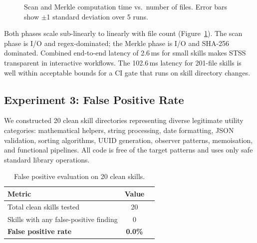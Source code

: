 \documentclass[11pt,twocolumn]{article}
\begin{document}
\begin{figure}[t]
\centering
{}
\caption{Scan and Merkle computation time vs.\ number of files.
Error bars show $\pm$1 standard deviation over 5 runs.}
\label{fig:perf}
\end{figure}

Both phases scale sub-linearly to linearly with file count
(Figure~\ref{fig:perf}). The scan phase is I/O and regex-dominated;
the Merkle phase is I/O and SHA-256 dominated. Combined end-to-end
latency of 2.6\,ms for small skills makes STSS transparent in interactive
workflows. The 102.6\,ms latency for 201-file skills is well within
acceptable bounds for a CI gate that runs on skill directory changes.

\subsection{Experiment 3: False Positive Rate}

We constructed 20 clean skill directories representing diverse legitimate
utility categories: mathematical helpers, string processing, date formatting,
JSON validation, sorting algorithms, UUID generation, observer patterns,
memoisation, and functional pipelines. All code is free of the target patterns
and uses only safe standard library operations.

\begin{table}[h]
\centering
\caption{False positive evaluation on 20 clean skills.}
\label{tab:fp}
\renewcommand{\arraystretch}{1.1}
\scriptsize
\begin{tabular}{lcc}
\toprule
\textbf{Metric} & \textbf{Value} \\
\midrule
Total clean skills tested & 20 \\
Skills with any false-positive finding & 0 \\
\textbf{False positive rate} & \textbf{0.0\%} \\
\bottomrule
\end{tabular}
\end{table}
\end{document}
